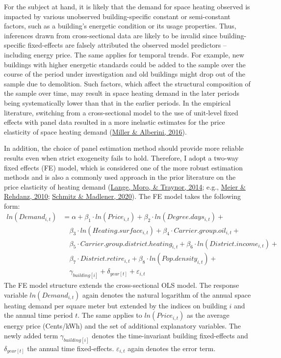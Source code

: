 \documentclass[12pt,twoside]{reedthesis}
\begin{document}
For the subject at hand, it is likely that the demand for space heating observed is impacted by various unobserved building-specific constant or semi-constant factors, such as a building's energetic condition or its usage properties. Thus, inferences drawn from cross-sectional data are likely to be invalid since building-specific fixed-effects are falsely attributed the observed model predictors -- including energy price. The same applies for temporal trends. For example, new buildings with higher energetic standards could be added to the sample over the course of the period under investigation and old buildings might drop out of the sample due to demolition. Such factors, which affect the structural composition of the sample over time, may result in space heating demand in the later periods being systematically lower than that in the earlier periods. In the empirical literature, switching from a cross-sectional model to the use of unit-level fixed effects with panel data resulted in a more inelastic estimates for the price elasticity of space heating demand (\protect\hyperlink{ref-miller_alberini16}{Miller \& Alberini, 2016}).

In addition, the choice of panel estimation method should provide more reliable results even when strict exogeneity fails to hold. Therefore, I adopt a two-way fixed effects (FE) model, which is considered one of the more robust estimation methods and is also a commonly used approach in the prior literature on the price elasticity of heating demand (\protect\hyperlink{ref-lange_etal14}{Lange, Moro, \& Traynor, 2014}; e.g., \protect\hyperlink{ref-meier_rehdanz10}{Meier \& Rehdanz, 2010}; \protect\hyperlink{ref-schmitz_madlener20}{Schmitz \& Madlener, 2020}). The FE model takes the following form:
\begin{align*}
ln(Demand_{i,t}) & = \alpha + \beta_1 \cdot ln(Price_{i,t}) + \beta_2 \cdot ln(Degree.days_{i,t}) + \\
 & \quad \beta_3 \cdot ln(Heating.surface_{i,t}) + \beta_{4} \cdot Carrier.group.oil_{i,t} + \\
 & \quad \beta_{5} \cdot Carrier.group.district.heating_{i,t} + \beta_{6} \cdot ln(District.income_{i,t}) + \\
 & \quad \beta_{7} \cdot District.retire_{i,t} + \beta_{8} \cdot ln(Pop.density_{i,t}) + \\
 & \quad \gamma_{building[i]} + \delta_{year[t]} + \varepsilon_{i,t}
\end{align*}
The FE model structure extends the cross-sectional OLS model. The response variable \(ln(Demand_{i,t})\) again denotes the natural logarithm of the annual space heating demand per square meter but extended by the indices on building \(i\) and the annual time period \(t\). The same applies to \(ln(Price_{i,t})\) as the average energy price (Cents/kWh) and the set of additional explanatory variables. The newly added term \(\gamma_{building[i]}\) denotes the time-invariant building fixed-effects and \(\delta_{year[t]}\) the annual time fixed-effects. \(\varepsilon_{i,t}\) again denotes the error term.
\end{document}
